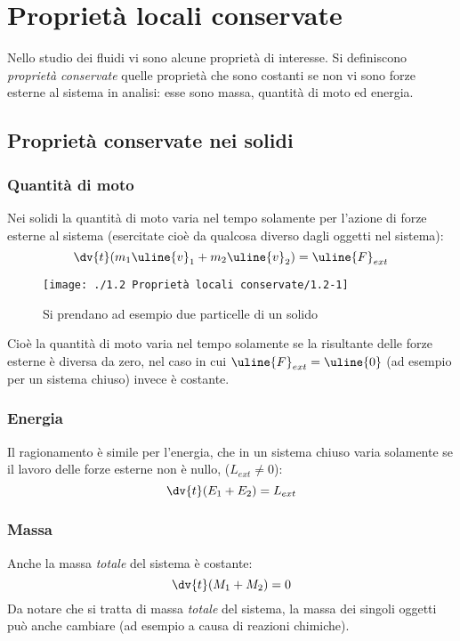 %
\section{Proprietà locali conservate}
Nello studio dei fluidi vi sono alcune proprietà di interesse.
Si definiscono \textit{proprietà conservate} quelle proprietà che sono costanti se non vi sono forze esterne al sistema in analisi: esse sono massa, quantità di moto ed energia.
\subsection{Proprietà conservate nei solidi}
\subsubsection{Quantità di moto}
Nei solidi la quantità di moto varia nel tempo solamente per l'azione di forze esterne al sistema (esercitate cioè da qualcosa diverso dagli oggetti nel sistema):
%
	\begin{equation*}
		\dv{t} (m_1 \uline{v}_1 + m_2 \uline{v}_2) = \uline{F}_{ext}
	\end{equation*}
%
	\begin{figure}[H]
		\texttt{[image: ./1.2 Proprietà locali conservate/1.2-1]}
		\centering
		\caption{Si prendano ad esempio due particelle di un solido}
	\end{figure}
%
Cioè la quantità di moto varia nel tempo solamente se la risultante delle forze esterne è diversa da zero, nel caso in cui $\uline{F}_{ext} = \uline{0}$ (ad esempio per un sistema chiuso) invece è costante.
\subsubsection{Energia}
Il ragionamento è simile per l'energia, che in un sistema chiuso varia solamente se il lavoro delle forze esterne non è nullo, ($L_{ext} \neq 0$):
%
	\begin{equation*}
		\dv{t} (E_1 + E_2) = L_{ext}
	\end{equation*}
%
\subsubsection{Massa}
Anche la massa \textit{totale} del sistema è costante:
%
	\begin{equation*}
		\dv{t} (M_1 + M_2) = 0
	\end{equation*}
%
Da notare che si tratta di massa \textit{totale} del sistema, la massa dei singoli oggetti può anche cambiare (ad esempio a causa di reazioni chimiche).
%
